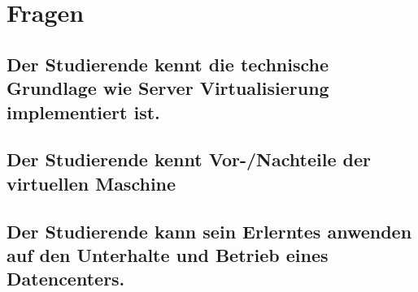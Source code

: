 \section{Fragen}

\subsection{Der Studierende kennt die technische Grundlage wie Server Virtualisierung implementiert ist.}

\subsection{Der Studierende kennt Vor-/Nachteile der virtuellen Maschine}

\subsection{Der Studierende kann sein Erlerntes anwenden auf den Unterhalte und Betrieb eines Datencenters.}
